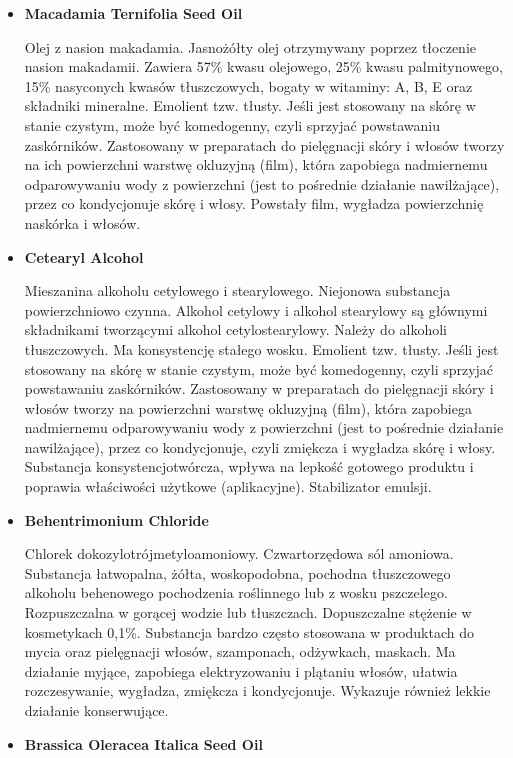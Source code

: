 \begin{itemize}
\item \textbf{Macadamia Ternifolia Seed Oil}

Olej z nasion makadamia. Jasnożółty olej otrzymywany poprzez tłoczenie nasion makadamii. Zawiera 57\% kwasu olejowego, 25\% kwasu palmitynowego, 15\% nasyconych kwasów tłuszczowych, bogaty w witaminy: A, B, E oraz składniki mineralne. Emolient tzw. tłusty. Jeśli jest stosowany na skórę w stanie czystym, może być komedogenny, czyli sprzyjać powstawaniu zaskórników. Zastosowany w preparatach do pielęgnacji skóry i włosów tworzy na ich powierzchni warstwę okluzyjną (film), która zapobiega nadmiernemu odparowywaniu wody z powierzchni (jest to pośrednie działanie nawilżające), przez co kondycjonuje skórę i włosy. Powstały film, wygładza powierzchnię naskórka i włosów.

\item \textbf{Cetearyl Alcohol}

Mieszanina alkoholu cetylowego i stearylowego. Niejonowa substancja powierzchniowo czynna. Alkohol cetylowy i alkohol stearylowy są głównymi składnikami tworzącymi alkohol cetylostearylowy. Należy do alkoholi tłuszczowych. Ma konsystencję stałego wosku. Emolient tzw. tłusty. Jeśli jest stosowany na skórę w stanie czystym, może być komedogenny, czyli sprzyjać powstawaniu zaskórników. Zastosowany w preparatach do pielęgnacji skóry i włosów tworzy na powierzchni warstwę okluzyjną (film), która zapobiega nadmiernemu odparowywaniu wody z powierzchni (jest to pośrednie działanie nawilżające), przez co kondycjonuje, czyli zmiękcza i wygładza skórę i włosy. Substancja konsystencjotwórcza, wpływa na lepkość gotowego produktu i poprawia właściwości użytkowe (aplikacyjne). Stabilizator emulsji.

\item \textbf{Behentrimonium Chloride}

Chlorek dokozylotrójmetyloamoniowy. Czwartorzędowa sól amoniowa. Substancja łatwopalna, żółta, woskopodobna, pochodna tłuszczowego alkoholu behenowego pochodzenia roślinnego lub z wosku pszczelego. Rozpuszczalna w gorącej wodzie lub tłuszczach. Dopuszczalne stężenie w kosmetykach 0,1\%. Substancja bardzo często stosowana w produktach do mycia oraz pielęgnacji włosów, szamponach, odżywkach, maskach. Ma działanie myjące, zapobiega elektryzowaniu i plątaniu włosów, ułatwia rozczesywanie, wygładza, zmiękcza i kondycjonuje. Wykazuje również lekkie działanie konserwujące.

\item \textbf{Brassica Oleracea Italica Seed Oil}


\end{itemize}
